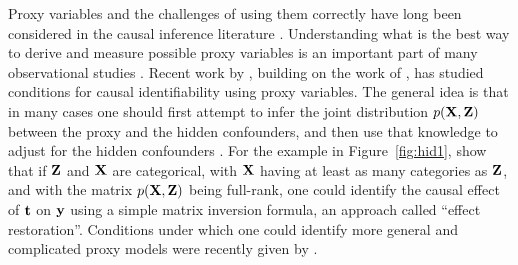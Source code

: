 Proxy variables and the challenges of using them correctly have long been considered in the causal inference literature \citep{wickens1972note,frost1979proxy}. Understanding what is the best way to derive and measure possible proxy variables is an important part of many observational studies \citep{filmer2001estimating,kolenikov2009socioeconomic,wooldridge2009estimating}.
Recent work by \citet{cai2008identifying,greenland2008bias}, building on the work of \citet{greenland1983correcting,selen1986adjusting}, has studied conditions for causal identifiability using proxy variables.
The general idea is that in many cases one should first attempt to infer the joint distribution $p(\mathbf{X},\mathbf{Z})$ between the proxy and the hidden confounders, and then use that knowledge to adjust for the hidden confounders \citep{wooldridge2009estimating,pearl2012measurement,kuroki2014measurement,miao2016identifying,edwards2015all}.
For the example in Figure~\ref{fig:hid1}, \citet{cai2008identifying,greenland2008bias,pearl2012measurement} show that if $\mathbf{Z}$ and $\mathbf{X}$ are categorical, with $\mathbf{X}$ having at least as many categories as $\mathbf{Z}$, and with the matrix $p(\mathbf{X},\mathbf{Z})$ being full-rank, one could identify the causal effect of $\mathbf{t}$ on $\mathbf{y}$ using a simple matrix inversion formula, an approach called ``effect restoration''.
Conditions under which one could identify more general and complicated proxy models were recently given by \citep{miao2016identifying}. 



